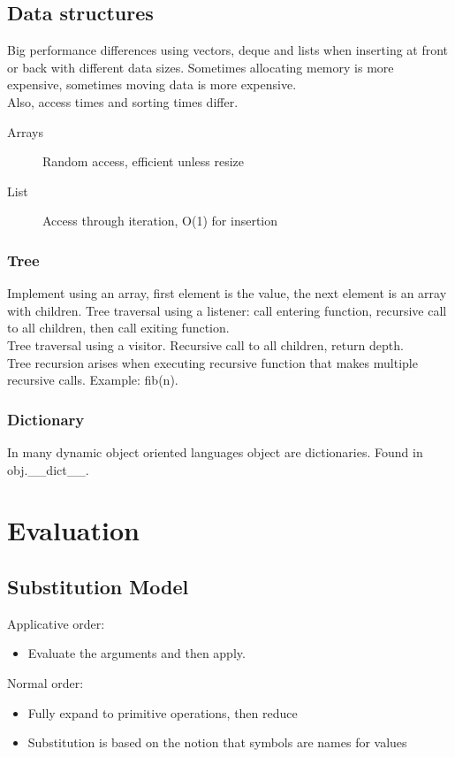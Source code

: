 \documentclass[a4paper]{article}
\begin{document}
\subsection{Data structures}
Big performance differences using vectors, deque and lists when inserting at
front or back with different data sizes. Sometimes allocating memory is more
expensive, sometimes moving data is more expensive.\\
Also, access times and sorting times differ.
\begin{description}
	\item[Arrays] Random access, efficient unless resize
	\item[List] Access through iteration, O(1) for insertion
\end{description}
\subsubsection{Tree}
Implement using an array, first element is the value, the next element is an array with children.
Tree traversal using a listener: call entering function, recursive call to all
children, then call exiting function.\\
Tree traversal using a visitor. Recursive call to all children, return depth.
\\Tree recursion arises when executing recursive function that makes multiple
recursive calls. Example: fib(n).

\subsubsection{Dictionary}
In many dynamic object oriented languages object are dictionaries. Found in
obj.\_\_dict\_\_.

\section{Evaluation}
\subsection{Substitution Model}
Applicative order:
\begin{itemize}
	\item Evaluate the arguments and then apply.
\end{itemize}
Normal order:
\begin{itemize}
	\item Fully expand to primitive operations, then reduce
\end{itemize}
\begin{itemize}
	\item Substitution is based on the notion that symbols are names for
		values
\end{itemize}
\end{document}

